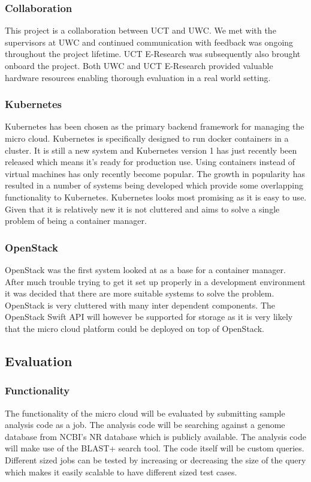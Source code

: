 \documentclass{sig-alternate-05-2015}
\begin{document}
\subsubsection{Collaboration}
This project is a collaboration between UCT and UWC. We met with the supervisors at UWC and continued communication with feedback was ongoing throughout the project lifetime. UCT E-Research was subsequently also brought onboard the project. Both UWC and UCT E-Research provided valuable hardware resources enabling thorough evaluation in a real world setting.

\subsubsection{Kubernetes}
Kubernetes has been chosen as the primary backend framework for managing the micro cloud. Kubernetes is specifically designed to run docker containers in a cluster. It is still a new system and Kubernetes version 1 has just recently been released which means it's ready for production use. Using containers instead of virtual machines has only recently become popular. The growth in popularity has resulted in a number of systems being developed which provide some overlapping functionality to Kubernetes. Kubernetes looks most promising as it is easy to use. Given that it is relatively new it is not cluttered and aims to solve a single problem of being a container manager. 

\subsubsection{OpenStack}
OpenStack was the first system looked at as a base for a container manager. After much trouble trying to get it set up properly in a development environment it was decided that there are more suitable systems to solve the problem. OpenStack is very cluttered with many inter dependent components. The OpenStack Swift API will however be supported for storage as it is very likely that the micro cloud platform could be deployed on top of OpenStack.

\subsection{Evaluation}
\subsubsection{Functionality}
The functionality of the micro cloud will be evaluated by submitting sample analysis code as a job. The analysis code will be searching against a genome database from NCBI's NR database which is publicly available. The analysis code will make use of the BLAST+ search tool. The code itself will be custom queries. Different sized jobs can be tested by increasing or decreasing the size of the query which makes it easily scalable to have different sized test cases.
\end{document}
